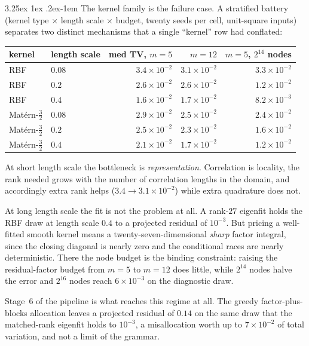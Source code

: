 \documentclass[11pt]{article}
\makeatletter
\renewcommand\paragraph{\@startsection{paragraph}{4}{\z@}%
  {3.25ex \@plus1ex \@minus.2ex}{-1em}%
  {\normalfont\normalsize\itshape}}
\makeatother
\begin{document}
\paragraph{The kernel family is the failure case.} A stratified battery
(kernel type $\times$ length scale $\times$ budget, twenty seeds per
cell, unit-square inputs) separates two distinct mechanisms that a
single ``kernel'' row had conflated:

\begin{center}\small
\begin{tabular}{llrrr}
\toprule
kernel & length scale & med TV, $m{=}5$ & $m{=}12$ & $m{=}5$, $2^{14}$ nodes\\
\midrule
RBF & $0.08$ & $3.4\times10^{-2}$ & $3.1\times10^{-2}$ & $3.3\times10^{-2}$\\
RBF & $0.2$  & $2.6\times10^{-2}$ & $2.6\times10^{-2}$ & $1.2\times10^{-2}$\\
RBF & $0.4$  & $1.6\times10^{-2}$ & $1.7\times10^{-2}$ & $8.2\times10^{-3}$\\
Mat\'ern-$\tfrac32$ & $0.08$ & $2.9\times10^{-2}$ & $2.5\times10^{-2}$ & $2.4\times10^{-2}$\\
Mat\'ern-$\tfrac32$ & $0.2$  & $2.5\times10^{-2}$ & $2.3\times10^{-2}$ & $1.6\times10^{-2}$\\
Mat\'ern-$\tfrac32$ & $0.4$  & $2.1\times10^{-2}$ & $1.7\times10^{-2}$ & $1.2\times10^{-2}$\\
\bottomrule
\end{tabular}
\end{center}

At short length scale the bottleneck is \emph{representation}.
Correlation is locality, the rank needed grows with the number of
correlation lengths in the domain, and accordingly extra rank helps
($3.4\to3.1\times10^{-2}$) while extra quadrature does not.

At long length scale the fit is not the problem at all. A rank-$27$
eigenfit holds the RBF draw at length scale $0.4$ to a projected residual
of $10^{-3}$. But pricing a well-fitted smooth kernel means a
twenty-seven-dimensional \emph{sharp} factor integral, since the closing
diagonal is nearly zero and the conditional races are nearly
deterministic. There the node budget is the binding constraint:
raising the residual-factor budget from $m=5$ to $m=12$ does little,
while $2^{14}$ nodes halve the error
and $2^{16}$ nodes reach $6\times10^{-3}$ on the diagnostic draw.

Stage~6 of the pipeline is what reaches this regime at all. The greedy
factor-plus-blocks allocation leaves a projected residual of $0.14$ on
the same draw that the matched-rank eigenfit holds to $10^{-3}$, a
misallocation worth up to $7\times10^{-2}$ of total variation, and not a
limit of the grammar.
\end{document}
